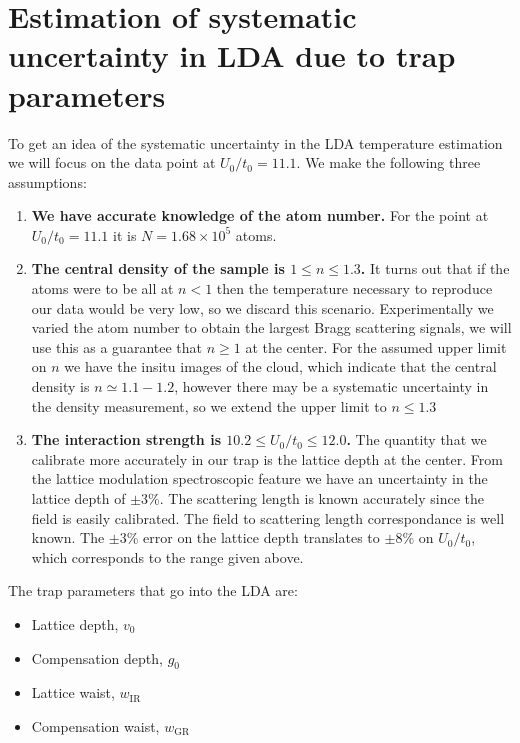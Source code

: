 \documentclass[11pt,letter]{article}
\begin{document}
\section{ Estimation of systematic uncertainty in LDA due to trap parameters }  

To get an idea of the systematic uncertainty in the LDA temperature estimation
we will focus on the data point at $U_{0}/t_{0}=11.1$.  We make the following
three assumptions: 

\begin{enumerate} 

\item  \textbf{We have accurate knowledge of the atom number.} For the point at
$U_{0}/t_{0}=11.1$ it is $N=1.68\times 10^{5}$ atoms.

\item  \textbf{The central density of the sample is $1\leq n\leq 1.3$.}   It
turns out that if the atoms were to be all at $n<1$ then the temperature
necessary to reproduce our data would be very low, so we discard this scenario.
Experimentally we varied the atom number to obtain the largest Bragg scattering
signals,  we will use this as a guarantee that $n\geq 1$ at the center.   For
the assumed upper limit on $n$ we have the insitu images of the cloud, which
indicate that the central density is $n\simeq 1.1-1.2$, however there may be a
systematic uncertainty in the density measurement, so we extend the upper limit
to $n\leq1.3$ 

\item \textbf{The interaction strength is  $10.2 \leq U_{0}/t_{0} \leq 12.0$.}
The quantity that we calibrate more accurately in our trap is the lattice depth
at the center.  From the lattice modulation spectroscopic feature we have an
uncertainty in the lattice depth of $\pm3$\%.   The scattering length is known
accurately since the field is easily calibrated.  The field to scattering
length correspondance is well known\cite{Zurn2013}.  The $\pm3$\% error on the
lattice depth translates to $\pm8$\% on $U_{0}/t_{0}$, which corresponds to the
range given above.   

\end{enumerate}

The trap parameters that go into the LDA are: 
\begin{itemize}

\item Lattice depth, $v_{0}$ 

\item Compensation depth, $g_{0}$ 

\item Lattice waist, $w_{\mathrm{IR}}$ 

\item Compensation waist, $w_{\mathrm{GR}}$ 
\end{itemize}
\end{document}
